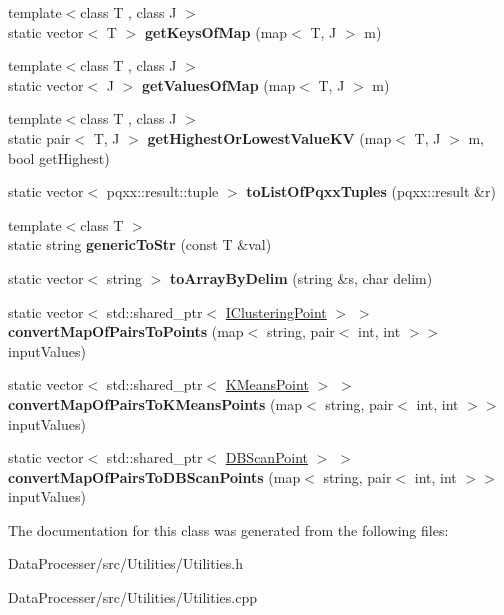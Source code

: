 \begin{DoxyCompactItemize}
{\footnotesize template$<$class T , class J $>$ }\\static vector$<$ T $>$ {\bfseries get\+Keys\+Of\+Map} (map$<$ T, J $>$ m)
\item 
\mbox{\label{classUtilities_a7e9774c5147408d41ca75e54970e74e2}} 
{\footnotesize template$<$class T , class J $>$ }\\static vector$<$ J $>$ {\bfseries get\+Values\+Of\+Map} (map$<$ T, J $>$ m)
\item 
\mbox{\label{classUtilities_a1770afc90489caae248bbbcac40e71d9}} 
{\footnotesize template$<$class T , class J $>$ }\\static pair$<$ T, J $>$ {\bfseries get\+Highest\+Or\+Lowest\+Value\+KV} (map$<$ T, J $>$ m, bool get\+Highest)
\item 
\mbox{\label{classUtilities_a9ad8649d85727540f66adb4c6644c0a1}} 
static vector$<$ pqxx\+::result\+::tuple $>$ {\bfseries to\+List\+Of\+Pqxx\+Tuples} (pqxx\+::result \&r)
\item 
\mbox{\label{classUtilities_a868b728a68449405c6d65632246ddf42}} 
{\footnotesize template$<$class T $>$ }\\static string {\bfseries generic\+To\+Str} (const T \&val)
\item 
\mbox{\label{classUtilities_a522d29d118f7a72a451b9c6392f24081}} 
static vector$<$ string $>$ {\bfseries to\+Array\+By\+Delim} (string \&s, char delim)
\item 
\mbox{\label{classUtilities_a82e8f55c09721bf7d8cd483047f44140}} 
static vector$<$ std\+::shared\+\_\+ptr$<$ \hyperlink{classIClusteringPoint}{I\+Clustering\+Point} $>$ $>$ {\bfseries convert\+Map\+Of\+Pairs\+To\+Points} (map$<$ string, pair$<$ int, int $>$$>$ input\+Values)
\item 
\mbox{\label{classUtilities_a6f03912b65bc19ac2e4c52f42ef970b1}} 
static vector$<$ std\+::shared\+\_\+ptr$<$ \hyperlink{classKMeansPoint}{K\+Means\+Point} $>$ $>$ {\bfseries convert\+Map\+Of\+Pairs\+To\+K\+Means\+Points} (map$<$ string, pair$<$ int, int $>$$>$ input\+Values)
\item 
\mbox{\label{classUtilities_aba6071414ba172e34c2f7e6996b8d5e5}} 
static vector$<$ std\+::shared\+\_\+ptr$<$ \hyperlink{classDBScanPoint}{D\+B\+Scan\+Point} $>$ $>$ {\bfseries convert\+Map\+Of\+Pairs\+To\+D\+B\+Scan\+Points} (map$<$ string, pair$<$ int, int $>$$>$ input\+Values)
\end{DoxyCompactItemize}


The documentation for this class was generated from the following files\+:\begin{DoxyCompactItemize}
\item 
Data\+Processer/src/\+Utilities/Utilities.\+h\item 
Data\+Processer/src/\+Utilities/Utilities.\+cpp\end{DoxyCompactItemize}
